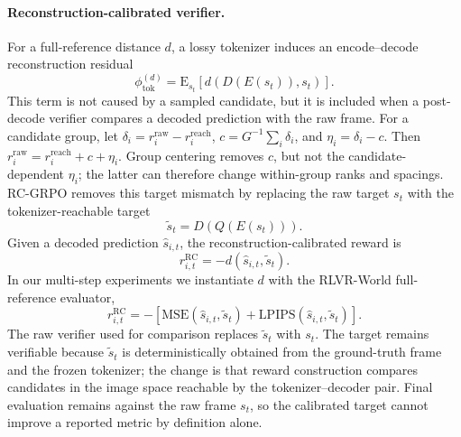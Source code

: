 \documentclass[letterpaper]{article} %
\begin{document}
\paragraph{Reconstruction-calibrated verifier.}
For a full-reference distance $d$, a lossy tokenizer induces an encode--decode reconstruction residual
\begin{equation}
\phi_{\mathrm{tok}}^{(d)}
=
\mathrm{E}_{s_t}
\left[d(D(E(s_t)),s_t)\right].
\end{equation}
This term is not caused by a sampled candidate, but it is included when a post-decode verifier compares a decoded prediction with the raw frame. For a candidate group, let $\delta_i=r_i^{\mathrm{raw}}-r_i^{\mathrm{reach}}$, $c=G^{-1}\sum_i\delta_i$, and $\eta_i=\delta_i-c$. Then $r_i^{\mathrm{raw}}=r_i^{\mathrm{reach}}+c+\eta_i$. Group centering removes $c$, but not the candidate-dependent $\eta_i$; the latter can therefore change within-group ranks and spacings. RC-GRPO removes this target mismatch by replacing the raw target $s_t$ with the tokenizer-reachable target
\begin{equation}
\tilde{s}_t = D(Q(E(s_t))).
\end{equation}
Given a decoded prediction $\hat{s}_{i,t}$, the reconstruction-calibrated reward is
\begin{equation}
r_{i,t}^{\mathrm{RC}}
=
-d(\hat{s}_{i,t},\tilde{s}_t).
\end{equation}
In our multi-step experiments we instantiate $d$ with the RLVR-World full-reference evaluator,
\begin{equation}
r_{i,t}^{\mathrm{RC}}
=
-\left[
\mathrm{MSE}(\hat{s}_{i,t},\tilde{s}_t)
+
\mathrm{LPIPS}(\hat{s}_{i,t},\tilde{s}_t)
\right].
\end{equation}
The raw verifier used for comparison replaces $\tilde{s}_t$ with $s_t$. The target remains verifiable because $\tilde{s}_t$ is deterministically obtained from the ground-truth frame and the frozen tokenizer; the change is that reward construction compares candidates in the image space reachable by the tokenizer--decoder pair. Final evaluation remains against the raw frame $s_t$, so the calibrated target cannot improve a reported metric by definition alone.
\end{document}
